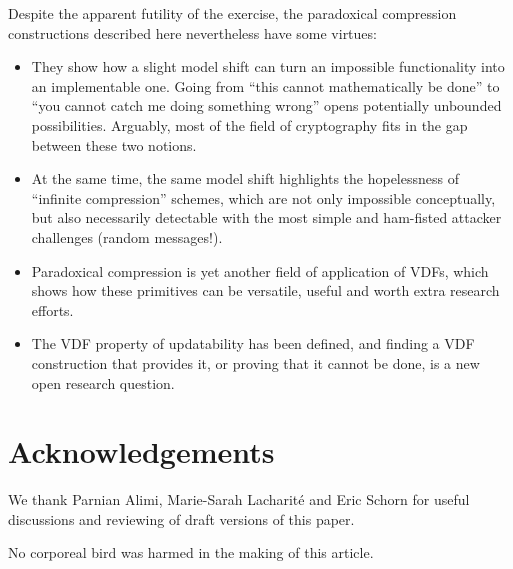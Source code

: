\documentclass{llncs}
\begin{document}
Despite the apparent futility of the exercise, the paradoxical
compression constructions described here nevertheless have some virtues:
\begin{itemize}

    \item They show how a slight model shift can turn an impossible
    functionality into an implementable one. Going from ``this cannot
    mathematically be done'' to ``you cannot catch me doing something
    wrong'' opens potentially unbounded possibilities. Arguably, most of
    the field of cryptography fits in the gap between these two notions.

    \item At the same time, the same model shift highlights the
    hopelessness of ``infinite compression'' schemes, which are not only
    impossible conceptually, but also necessarily detectable with the
    most simple and ham-fisted attacker challenges (random messages!).

    \item Paradoxical compression is yet another field of application of
    VDFs, which shows how these primitives can be versatile, useful and
    worth extra research efforts.

    \item The VDF property of updatability has been defined, and finding
    a VDF construction that provides it, or proving that it cannot be
    done, is a new open research question.

\end{itemize}

\section*{Acknowledgements}

We thank Parnian Alimi, Marie-Sarah Lacharité and Eric Schorn for useful
discussions and reviewing of draft versions of this paper.

No corporeal bird was harmed in the making of this article.
\end{document}
